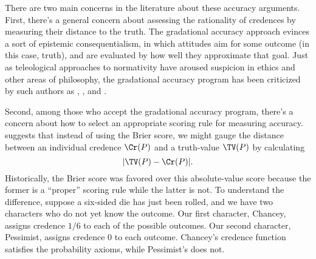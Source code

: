 There are two main concerns in the literature about these accuracy arguments. First, there's a general concern about assessing the rationality of credences by measuring their distance to the truth. The gradational accuracy approach evinces a sort of epistemic consequentialism, in which attitudes aim for some outcome (in this case, truth), and are evaluated by how well they approximate that goal. Just as teleological approaches to normativity have aroused suspicion in ethics and other areas of philosophy, the gradational accuracy program has been criticized by such authors as \citet{GreavesEDT},  \citet{BerkerTeleology}, and \citet{CarrEUT}. %
  
Second, among those who accept the gradational accuracy program, there's a concern about how to select an appropriate scoring rule for measuring accuracy. \citet{MaherJoyce} suggests that instead of using the Brier score, we might gauge the distance between an individual credence $\Cr(P)$ and a truth-value $\TV(P)$ by calculating
\begin{equation}
|\TV(P)-\Cr(P)|.
\end{equation}
Historically, the Brier score was favored over this absolute-value score because the former is a ``proper'' scoring rule while the latter is not. To understand the difference, suppose a six-sided die has just been rolled, and we have two characters who do not yet know the outcome. Our first character, Chancey, assigns credence $1/6$ to each of the possible outcomes. Our second character, Pessimist, assigns credence $0$ to each outcome. Chancey's credence function satisfies the probability axioms, while Pessimist's does not.


